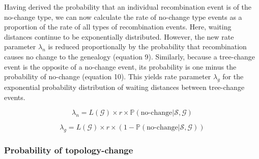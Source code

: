 \documentclass[11pt]{article}
\begin{document}
\noindent Having derived the probability that an individual recombination event 
is of the no-change type, we can now calculate 
the rate of no-change type events as a proportion of the rate of all types of 
recombination events. 
Here, waiting distances continue to be exponentially distributed. 
However, the new rate parameter $\lambda_n$ is reduced proportionally by 
the probability that recombination causes no change to the genealogy
(equation 9). Similarly, because a tree-change event is the opposite 
of a no-change event, its probability is one minus the probability
of no-change (equation 10). This yields rate parameter $\lambda_g$ for 
the exponential probability distribution of waiting distances between 
tree-change events.

\begin{equation}
	\lambda_{n} = 
	L(\mathcal{G}) \times r \times 
	\mathbb{P}(\text{no-change} | \mathcal{S},\mathcal{G})
\end{equation}


\begin{equation}
	\lambda_{g} = 
	L(\mathcal{G}) \times r \times 
	(1 - \mathbb{P}(\text{no-change} | \mathcal{S},\mathcal{G}))
\end{equation}



\subsubsection{Probability of topology-change}
\end{document}
